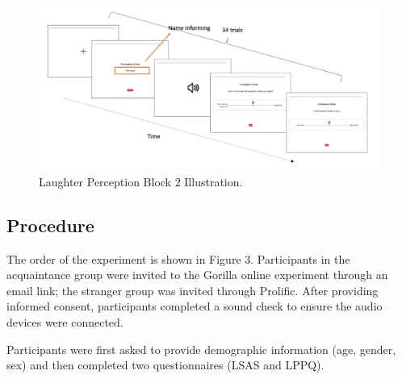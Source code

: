 \begin{figure}[h!] 
\centering
\includegraphics[width=1\textwidth]{Screenshot 2025-09-03 at 11.29.56.png}
\caption{\label{fig2}Laughter Perception Block 2 Illustration.}
\end{figure}


\subsection{Procedure}
The order of the experiment is shown in Figure 3. Participants in the acquaintance group were invited to the Gorilla online experiment through an email link; the stranger group was invited through Prolific. After providing informed consent, participants completed a sound check to ensure the audio devices were connected.

Participants were first asked to provide demographic information (age, gender, sex) and then completed two questionnaires (LSAS and LPPQ).

